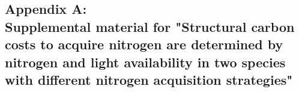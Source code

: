 \begin{singlespace}
    \chapter{\textbf{Appendix A: \\ Supplemental material for "Structural carbon costs to acquire nitrogen are determined by nitrogen and light availability in two species with different nitrogen acquisition strategies"}}
\end{singlespace}

\setcounter{table}{0}
\renewcommand{\thetable}{A\arabic{table}}

\setcounter{figure}{0}
\renewcommand{\thefigure}{A\arabic{figure}}

\begin{table}[h!]
    \caption{Summary table containing volumes of compounds used to create modified Hoagland's solutions for each soil nitrogen fertilization treatment. All volumes are expressed as milliliters per liter (mL/L)}
    \label{table:tab.a1}
\end{table}
